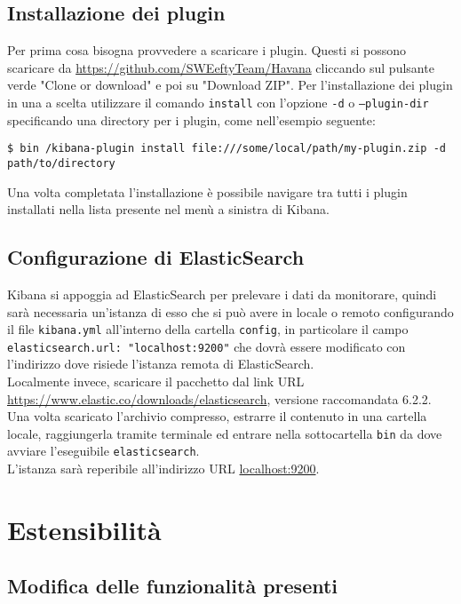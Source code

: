 \subsection{Installazione dei plugin}
Per prima cosa bisogna provvedere a scaricare i plugin. Questi si possono scaricare da \href{https://github.com/SWEeftyTeam/Havana}{https://github.com/SWEeftyTeam/Havana} cliccando sul pulsante verde "Clone or download" e poi su "Download ZIP".
Per l'installazione dei plugin in una  a scelta utilizzare il comando \texttt{install} con l'opzione \texttt{-d} o \texttt{--plugin-dir}  specificando una directory per i plugin, come nell'esempio seguente:
\begin{lstlisting}
$ bin /kibana-plugin install file:///some/local/path/my-plugin.zip -d path/to/directory 
\end{lstlisting}
Una volta completata l'installazione è possibile navigare tra tutti i plugin installati nella lista presente nel menù a sinistra di Kibana.
\subsection{Configurazione di ElasticSearch}
Kibana si appoggia ad ElasticSearch per prelevare i dati da monitorare, quindi sarà necessaria un'istanza di esso che si può avere in locale o remoto configurando il file \texttt{kibana.yml} all'interno della cartella \texttt{config}, in particolare il campo \texttt{elasticsearch.url: "localhost:9200"} che dovrà essere modificato con l'indirizzo dove risiede l'istanza remota di ElasticSearch.\\
Localmente invece, scaricare il pacchetto dal link URL \url{https://www.elastic.co/downloads/elasticsearch}, versione raccomandata 6.2.2.
Una volta scaricato l'archivio compresso, estrarre il contenuto in una cartella locale, raggiungerla tramite terminale ed entrare nella sottocartella \texttt{bin} da dove avviare l'eseguibile \texttt{elasticsearch}.\\
L'istanza sarà reperibile all'indirizzo URL \url{localhost:9200}.
\newpage
\section{Estensibilità}
\subsection{Modifica delle funzionalità presenti}
